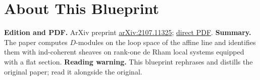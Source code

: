 

\chapter*{About This Blueprint}
\label{tates-thesis-de-rham-setting-about}

\textbf{Edition and PDF.} ArXiv preprint \href{https://arxiv.org/abs/2107.11325}{arXiv:2107.11325};
\href{https://arxiv.org/pdf/2107.11325}{direct PDF}.
\textbf{Summary.} The paper computes $D$-modules on the loop space of the affine line and identifies them with
ind-coherent sheaves on rank-one de Rham local systems equipped with a flat section.
\textbf{Reading warning.} This blueprint rephrases and distills the original paper; read it alongside the original.













